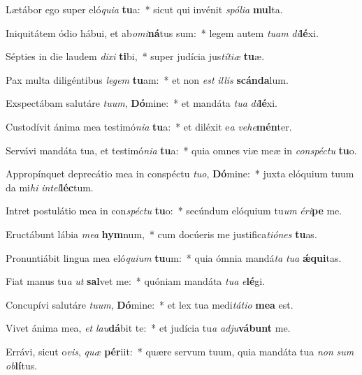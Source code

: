 \item Lætábor ego super eló\textit{qui}\textit{a} \textbf{tu}a:~* sicut qui invénit \textit{spó}\textit{li}\textit{a} \textbf{mul}ta.
\item Iniquitátem ódio hábui, et ab\textit{o}\textit{mi}\textbf{ná}tus sum:~* legem autem \textit{tu}\textit{am} \textit{di}\textbf{lé}xi.
\item Sépties in die laudem \textit{di}\textit{xi} \textbf{ti}bi,~* super judícia jus\textit{tí}\textit{ti}\textit{æ} \textbf{tu}æ.
\item Pax multa diligéntibus \textit{le}\textit{gem} \textbf{tu}am:~* et non \textit{est} \textit{il}\textit{lis} \textbf{scán}\textbf{da}lum.
\item Exspectábam salutáre \textit{tu}\textit{um}, \textbf{Dó}mine:~* et mandáta \textit{tu}\textit{a} \textit{di}\textbf{lé}xi.
\item Custodívit ánima mea testimó\textit{ni}\textit{a} \textbf{tu}a:~* et diléxit e\textit{a} \textit{ve}\textit{he}\textbf{mén}ter.
\item Servávi mandáta tua, et testimó\textit{ni}\textit{a} \textbf{tu}a:~* quia omnes viæ meæ in \textit{con}\textit{spéc}\textit{tu} \textbf{tu}o.
\item Appropínquet deprecátio mea in conspéctu \textit{tu}\textit{o}, \textbf{Dó}mine:~* juxta elóquium tuum da mi\textit{hi} \textit{in}\textit{tel}\textbf{léc}tum.
\item Intret postulátio mea in con\textit{spéc}\textit{tu} \textbf{tu}o:~* secúndum elóquium tu\textit{um} \textit{é}\textit{ri}\textbf{pe} me.
\item Eructábunt lábia \textit{me}\textit{a} \textbf{hym}num,~* cum docúeris me justifica\textit{ti}\textit{ó}\textit{nes} \textbf{tu}as.
\item Pronuntiábit lingua mea eló\textit{qui}\textit{um} \textbf{tu}um:~* quia ómnia mandá\textit{ta} \textit{tu}\textit{a} \textbf{ǽ}\textbf{qui}tas.
\item Fiat manus tu\textit{a} \textit{ut} \textbf{sal}vet me:~* quóniam mandáta \textit{tu}\textit{a} \textit{e}\textbf{lé}gi.
\item Concupívi salutáre \textit{tu}\textit{um}, \textbf{Dó}mine:~* et lex tua medi\textit{tá}\textit{ti}\textit{o} \textbf{me}\textbf{a} est.
\item Vivet ánima mea, \textit{et} \textit{lau}\textbf{dá}bit te:~* et judícia tu\textit{a} \textit{ad}\textit{ju}\textbf{vá}\textbf{bunt} me.
\item Errávi, sicut o\textit{vis}, \textit{quæ} \textbf{pér}iit:~* quære servum tuum, quia mandáta tua \textit{non} \textit{sum} \textit{ob}\textbf{lí}tus.
